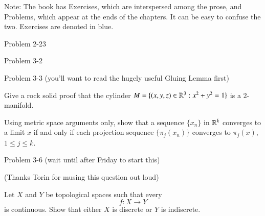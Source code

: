 \documentclass[minion]{homework651}
\begin{document}
Note: The book has Exercises, which are interspersed among the
prose, and Problems, which appear at the ends of the chapters.
It can be easy to confuse the two.  Exercises are denoted in blue.

\begin{problems}

\problem Problem 2-23

\problem Problem 3-2

\problem Problem 3-3 (you'll want to read the hugely useful Gluing Lemma first)

\problem {}

\problem Give a rock solid proof that the cylinder 
$M=\{(x,y,z)\in\mathbb R^3:x^2+y^2=1\}$
is a $2$-manifold.

\problem Using metric space arguments only, show that
a sequence $\{x_n\}$ in $\mathbb R^k$ converges to a limit $x$
if and only if each projection sequence $\{\pi_j(x_n)\}$ 
converges to $\pi_j(x)$, $1\le j\le k$.

\problem Problem 3-6 (wait until after Friday to start this)

\problem (Thanks Torin for musing this question out loud)\

Let
$X$ and $Y$ be topological spaces such that every
\[
f:X\to Y
\]
is continuous.  Show that either $X$ is discrete or $Y$ is indiscrete.

\end{problems}
\end{document}
